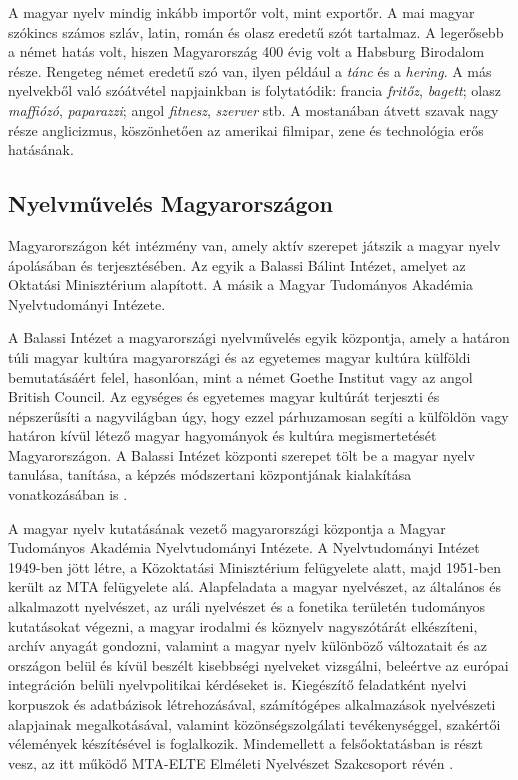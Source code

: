 \begin{multicols}{2}
  A magyar nyelv mindig inkább importőr volt, mint exportőr. A mai magyar szó\-kincs számos szláv, latin, román és olasz eredetű szót tartalmaz. A legerősebb a német hatás volt, hiszen Magyarország 400 évig volt a Habsburg Birodalom része. Rengeteg német eredetű szó van, ilyen például a \textit{tánc} és a \textit{hering}. A más nyelvekből való szóátvétel napjainkban is folytatódik: francia \textit{fritőz}, \textit{bagett}; olasz \textit{maffiózó}, \textit{paparazzi}; angol \textit{fitnesz}, \textit{szerver} stb. A mostanában átvett szavak nagy része anglicizmus, köszönhetően az amerikai filmipar, zene és technológia erős hatásának.

  \subsection{Nyelvművelés Magyarországon}

  Magyarországon két intézmény van, amely aktív szerepet játszik a magyar nyelv ápolásában és terjesztésében. Az egyik a Balassi Bálint Intézet, amelyet az Oktatási Minisztérium alapított. A másik a Magyar Tudományos Akadémia Nyelvtudományi Intézete.

  A Balassi Intézet a magyarországi nyelv\-mű\-ve\-lés egyik központja, amely a határon túli magyar kultúra magyarországi és az egyetemes magyar kultúra külföldi bemutatásáért felel, hasonlóan, mint a német Goethe Institut vagy az angol British Council. Az egységes és egyetemes ma\-gyar kultúrát terjeszti és népszerűsíti a nagyvilágban úgy, hogy ezzel pár\-hu\-za\-mo\-san segíti a külföldön vagy határon kívül létező magyar hagyományok és kultúra megismertetését Magyarországon. A Ba\-las\-si Intézet központi szerepet tölt be a magyar nyelv tanulása, tanítása, a képzés módszertani központjának kialakítása vo\-nat\-ko\-zá\-sá\-ban is \cite{bbi}. 


  A magyar nyelv kutatásának vezető ma\-gyar\-or\-szá\-gi központja a Magyar Tu\-do\-má\-nyos Akadémia Nyelvtudományi Intézete. A Nyelvtudományi Intézet 1949-ben jött létre, a Közoktatási Minisztérium felügyelete alatt, majd 1951-ben került az MTA felügyelete alá. Alapfeladata a magyar nyelvészet, az általános és alkalmazott nyelvészet, az uráli nyelvészet és a fonetika területén tudományos kutatásokat végezni, a magyar irodalmi és köznyelv nagyszótárát elkészíteni, archív anyagát gondozni, valamint a magyar nyelv különböző változatait és az országon belül és kívül beszélt kisebbségi nyelveket vizsgálni, beleértve az európai integráción belüli nyelvpolitikai kérdéseket is. Kiegészítő feladatként nyelvi korpuszok és adatbázisok létrehozásával, számítógépes alkalmazások nyelvészeti alapjainak meg\-al\-ko\-tá\-sá\-val, valamint közönségszolgálati tevékenységgel, szakértői vélemények ké\-szí\-té\-sé\-vel is foglalkozik. Mindemellett a felsőoktatásban is részt vesz, az itt működő MTA-ELTE Elméleti Nyelvészet Szakcsoport révén \cite{nytud}.


\end{multicols}
